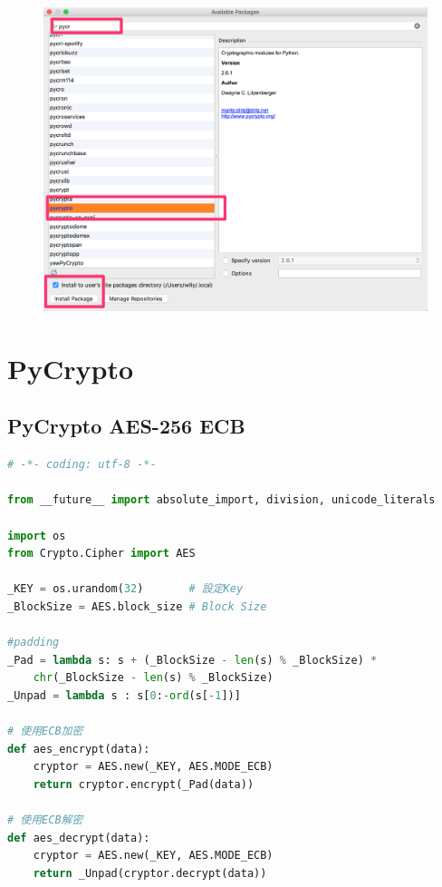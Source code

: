 \documentclass[12pt,a4paper]{article}
\begin{document}
{\begin{figure}[ht]
	\begin{center}
		\includegraphics[scale=0.2]{image/PyCharm3.png}
	\end{center}
\end{figure}

}

\newpage %
\section{PyCrypto}

\subsection{PyCrypto AES-256 ECB}
{

\begin{lstlisting}[language=Python]
# -*- coding: utf-8 -*-

from __future__ import absolute_import, division, unicode_literals

import os
from Crypto.Cipher import AES

_KEY = os.urandom(32)		# 設定Key
_BlockSize = AES.block_size	# Block Size

#padding
_Pad = lambda s: s + (_BlockSize - len(s) % _BlockSize) * 
	chr(_BlockSize - len(s) % _BlockSize)
_Unpad = lambda s : s[0:-ord(s[-1])]

# 使用ECB加密
def aes_encrypt(data):
    cryptor = AES.new(_KEY, AES.MODE_ECB)
    return cryptor.encrypt(_Pad(data))

# 使用ECB解密
def aes_decrypt(data):
    cryptor = AES.new(_KEY, AES.MODE_ECB)
    return _Unpad(cryptor.decrypt(data))
\end{lstlisting}
}
\end{document}
